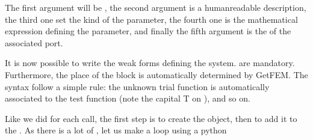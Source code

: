 \documentclass[letterpaper,10pt,english]{sphinxmanual}
\begin{document}
\begin{sphinxVerbatim}[commandchars=\\\{\}]
      
      
\end{sphinxVerbatim}

\sphinxAtStartPar
The first argument will be , the
second argument is a human\sphinxhyphen{}readable description, the third one set the
kind of the parameter, the fourth one is the mathematical expression
defining the parameter, and finally the fifth argument is the  of
the associated port.

\sphinxAtStartPar
It is now possible to write the weak forms defining the system.  are mandatory. Furthermore, the place of the block
is automatically determined by GetFEM. The syntax follow a simple rule:
the unknown trial function  is automatically associated to the test
function  (note the capital T on ), and so on.

\sphinxAtStartPar
Like we did for each call, the first step is to create the object, then
to add it to the . As there is a lot of , let us make a
loop using a python 
\end{document}
